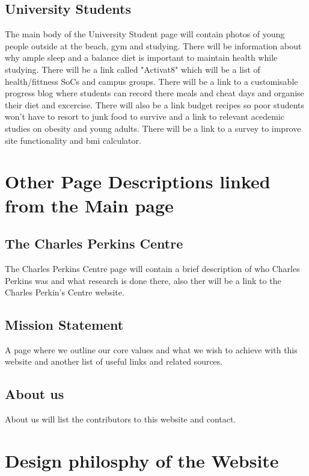 \documentclass[letterpaper,twoside,12pt]{article}
\begin{document}
\subsection{University Students}

The main body of the University Student page will contain photos of young people outside at the beach, gym and studying. There will be information about why ample sleep and a balance diet is important to maintain health while studying. There will be a link called "Activat8" which will be a list of health/fittness SoCs and campus groups. There will be a link to a customisable progress blog where students can record there meals and cheat days and organise their diet and excercise. There will also be a link budget recipes so poor students won't have to resort to junk food to survive and a link to relevant acedemic studies on obesity and young adults. There will be a link to a survey to improve site functionality and \acrshort{bmi} calculator.

\section{Other Page Descriptions linked from the Main page}

\subsection{The Charles Perkins Centre}

The Charles Perkins Centre page will contain a brief description of who Charles Perkins was and what research is done there, also ther will be a link to the Charles Perkin's Centre website.

\subsection{Mission Statement} 

A page where we outline our core values and what we wish to achieve with this website and another list of useful links and related sources.


\subsection{About us}

About us will list the contributors to this website and contact.

\section{Design philosphy of the Website}
\end{document}
